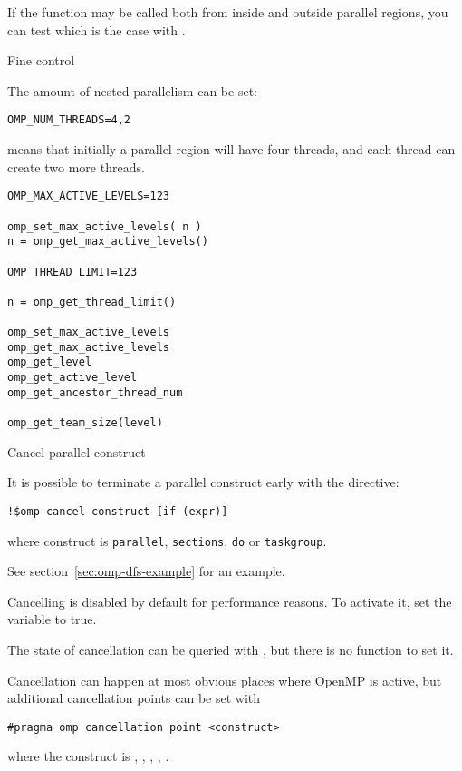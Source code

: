 If the function may be called both from inside and outside parallel
regions, you can test which is the case with .

 {Fine control}

The amount of nested parallelism can be set:
\begin{verbatim}
OMP_NUM_THREADS=4,2
\end{verbatim}
means that initially a parallel region will have four threads, and
each thread can create two more threads.

\begin{verbatim}
OMP_MAX_ACTIVE_LEVELS=123

omp_set_max_active_levels( n )
n = omp_get_max_active_levels()

OMP_THREAD_LIMIT=123

n = omp_get_thread_limit()

omp_set_max_active_levels
omp_get_max_active_levels
omp_get_level
omp_get_active_level
omp_get_ancestor_thread_num

omp_get_team_size(level)
\end{verbatim}


 {Cancel parallel construct}
\label{sec:omp-cancel}

It is possible to terminate a parallel construct early
with the  directive:
\begin{lstlisting}
!$omp cancel construct [if (expr)]
\end{lstlisting}
where construct is
\lstinline{parallel},
\lstinline{sections},
\lstinline{do}
or
\lstinline{taskgroup}.

See section~\ref{sec:omp-dfs-example} for an example.

Cancelling is disabled by default for performance reasons.
To activate it, set the  variable to true.

The state of cancellation can be queried with ,
but there is no function to set it.

Cancellation can happen at most obvious places where OpenMP is active,
but additional cancellation points can be set with 
\begin{lstlisting}
#pragma omp cancellation point <construct>
\end{lstlisting}
where the construct is , ,
, , .

